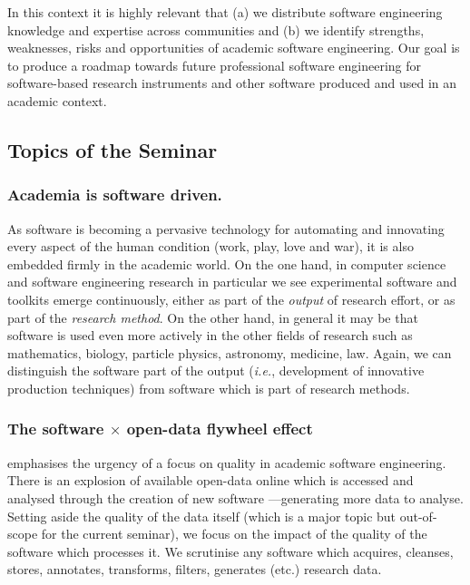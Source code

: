 \documentclass[a4paper,UKenglish]{dagman}
\renewcommand{\paragraph}[1]{\subsubsection*{#1}\xspace}
\newcommand{\ie}{\emph{i.e.},\xspace}
\begin{document}
In this context it is highly relevant that (a) we distribute software engineering knowledge and expertise across communities and (b) we identify  strengths, weaknesses, risks and opportunities of academic software engineering. Our goal is to produce a roadmap towards future professional software engineering for software-based research instruments and other software produced and used in an academic context.


\subsection*{Topics of the Seminar}

\paragraph{Academia is software driven.} As software is becoming a pervasive technology for automating and innovating every aspect of the human condition (work, play, love and war), it is also embedded firmly in the academic world. On the one hand, in computer science and software engineering research in particular we see experimental software and toolkits emerge continuously, either as part of the \emph{output} of research effort, or as part of the \emph{research method}. On the other hand, in general it may be that software is used even more actively in the other fields of research such as mathematics, biology, particle physics, astronomy, medicine, law. Again, we can distinguish the software part of the output (\ie development of innovative production techniques) from software which is part of research methods. 

\paragraph{The software $\times$ open-data flywheel effect} emphasises the urgency of a focus on quality in academic software engineering. There is an explosion of available open-data online which is accessed and analysed through the creation of new software ---generating more data to analyse. Setting aside the quality of the data itself (which is a major topic but out-of-scope for the current seminar), we focus on the impact of the quality of the software which processes it. We scrutinise any software which acquires, cleanses, stores, annotates, transforms, filters, generates (etc.) research data.
\end{document}
